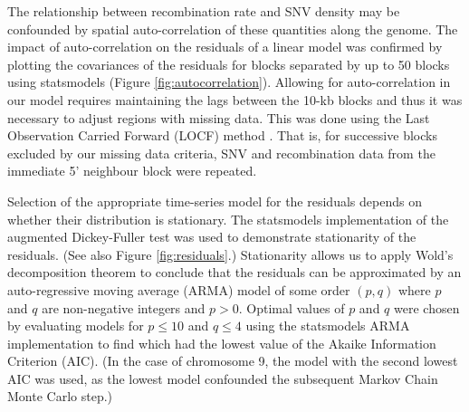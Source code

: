 The relationship between recombination rate and SNV density may be confounded by spatial auto-correlation of these quantities along the genome. The impact of auto-correlation on the residuals of a linear model was confirmed by plotting the covariances of the residuals for blocks separated by up to 50 blocks using statsmodels \citep{seabold2010statsmodels} (Figure \ref{fig:autocorrelation}). Allowing for auto-correlation in our model requires maintaining the lags between the 10-kb blocks and thus it was necessary to adjust regions with missing data. This was done using the Last Observation Carried Forward (LOCF) method \citep[][p. 38]{molenberghs2014handbook}. That is, for successive blocks excluded by our missing data criteria, SNV and recombination data from the immediate 5' neighbour block were repeated. 

Selection of the appropriate time-series model for the residuals depends on whether their distribution is stationary. The statsmodels \citep{seabold2010statsmodels} implementation of the augmented Dickey-Fuller test \citep[][p. 79]{mills2008econometric} was used to demonstrate stationarity of the residuals. (See also Figure \ref{fig:residuals}.) Stationarity allows us to apply Wold's decomposition theorem \citep[][p. 12]{mills2008econometric} to conclude that the residuals can be approximated by an auto-regressive moving average (ARMA) model of some order $(p,q)$ where $p$ and $q$ are non-negative integers and $p>0$. Optimal values of $p$ and $q$ were chosen by evaluating models for $p\leq 10$ and $q\leq 4$ using the statsmodels \citep{seabold2010statsmodels} ARMA implementation to find which had the lowest value of the Akaike Information Criterion (AIC). (In the case of chromosome 9, the model with the second lowest AIC was used, as the lowest model confounded the subsequent Markov Chain Monte Carlo step.)

